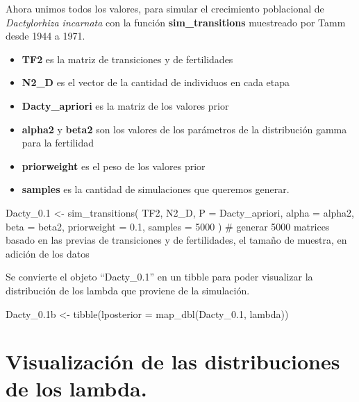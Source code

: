 \documentclass[
  12pt,
  letterpaper,
]{book}
\newenvironment{Shaded}{\begin{snugshade}}{\end{snugshade}}
\newcommand{\AttributeTok}[1]{\textcolor[rgb]{0.40,0.45,0.13}{#1}}
\newcommand{\CommentTok}[1]{\textcolor[rgb]{0.37,0.37,0.37}{#1}}
\newcommand{\DecValTok}[1]{\textcolor[rgb]{0.68,0.00,0.00}{#1}}
\newcommand{\FloatTok}[1]{\textcolor[rgb]{0.68,0.00,0.00}{#1}}
\newcommand{\FunctionTok}[1]{\textcolor[rgb]{0.28,0.35,0.67}{#1}}
\newcommand{\NormalTok}[1]{\textcolor[rgb]{0.00,0.23,0.31}{#1}}
\newcommand{\OtherTok}[1]{\textcolor[rgb]{0.00,0.23,0.31}{#1}}
\providecommand{\tightlist}{%
  \setlength{\itemsep}{0pt}\setlength{\parskip}{0pt}}\usepackage{longtable,booktabs,array}
\begin{document}
Ahora unimos todos los valores, para simular el crecimiento poblacional
de \emph{Dactylorhiza incarnata} con la función
\textbf{sim\_transitions} muestreado por Tamm desde 1944 a 1971.

\begin{itemize}
\tightlist
\item
  \textbf{TF2} es la matriz de transiciones y de fertilidades
\item
  \textbf{N2\_D} es el vector de la cantidad de individuos en cada etapa
\item
  \textbf{Dacty\_apriori} es la matriz de los valores prior
\item
  \textbf{alpha2} y \textbf{beta2} son los valores de los parámetros de
  la distribución gamma para la fertilidad
\item
  \textbf{priorweight} es el peso de los valores prior
\item
  \textbf{samples} es la cantidad de simulaciones que queremos generar.
\end{itemize}

\begin{Shaded}
\begin{Highlighting}[]
\NormalTok{Dacty\_0}\FloatTok{.1} \OtherTok{\textless{}{-}} \FunctionTok{sim\_transitions}\NormalTok{(}
\NormalTok{  TF2,}
\NormalTok{  N2\_D,}
  \AttributeTok{P =}\NormalTok{ Dacty\_apriori,}
  \AttributeTok{alpha =}\NormalTok{ alpha2,}
  \AttributeTok{beta =}\NormalTok{ beta2,}
  \AttributeTok{priorweight =} \FloatTok{0.1}\NormalTok{,}
  \AttributeTok{samples =} \DecValTok{5000}
\NormalTok{) }\CommentTok{\# generar 5000 matrices basado en las previas de transiciones y de fertilidades, el tamaño de muestra, en adición de los datos}
\end{Highlighting}
\end{Shaded}

Se convierte el objeto ``Dacty\_0.1'' en un tibble para poder visualizar
la distribución de los lambda que proviene de la simulación.

\begin{Shaded}
\begin{Highlighting}[]
\NormalTok{Dacty\_0}\FloatTok{.1}\NormalTok{b }\OtherTok{\textless{}{-}} \FunctionTok{tibble}\NormalTok{(}\AttributeTok{lposterior =} \FunctionTok{map\_dbl}\NormalTok{(Dacty\_0}\FloatTok{.1}\NormalTok{, lambda))}
\end{Highlighting}
\end{Shaded}

\section{Visualización de las distribuciones de los
lambda.}\label{visualizaciuxf3n-de-las-distribuciones-de-los-lambda.}
\end{document}
